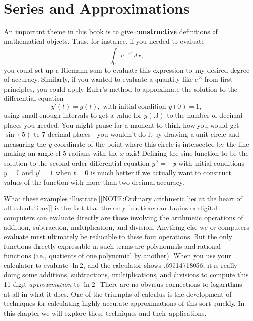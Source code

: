 
\chapter{Series and Approximations}
\label{chap:series-and-approximations}

An important theme in this book is to give {\bf constructive}
definitions of mathematical objects.
Thus, for instance, if you needed to evaluate
     \[
\int_0^1 e^{-x^2} \, dx,
\]
you could set up a Riemann sum to evaluate this expression to any
desired degree of accuracy.  Similarly, if you wanted to evaluate a
quantity like $e^{.3}$ from first principles, you could apply Euler's
method to approximate the solution to the differential equation
\[        
y'(t) = y(t), \mbox{ with initial condition } y(0) = 1,
\]
using small enough intervals to get a value for $y(.3)$ to the number
of decimal places you needed.  You might pause for a moment to think
how you would get $\sin(5)$ to 7 decimal places---you wouldn't do it
by drawing a unit circle and measuring the $y$-coordinate of the point
where this circle is intersected by the line making an angle of 5
radians with the $x$-axis!  Defining the sine function to be the
solution to the second-order differential equation $y''=-y$ with
initial conditions $y=0$ and $y'=1$ when $t=0$ is much better if we
actually want to construct values of the function with more than two
decimal accuracy.

What these examples illustrate 
[[NOTE:Ordinary arithmetic  lies at the heart  of all calculations]]
is the fact that the only functions our brains or digital computers
can evaluate directly are those involving the arithmetic operations of
addition, subtraction, multiplication, and division. Anything else we
or computers evaluate must ultimately be reducible to these four
operations.  But the only functions directly expressible in such terms
are polynomials and rational functions (i.e., quotients of one
polynomial by another).  When you use your calculator to evaluate $\ln
2$, and the calculator shows .69314718056, it is really doing some
additions, subtractions, multiplications, and divisions to compute
this 11-digit {\em approximation\/} to $\ln 2$\,.  There are no
obvious connections to logarithms at all in what it does.  One of the
triumphs of calculus is the development of techniques for calculating
highly accurate approximations of this sort quickly.  In this chapter
we will explore these techniques and their applications.



